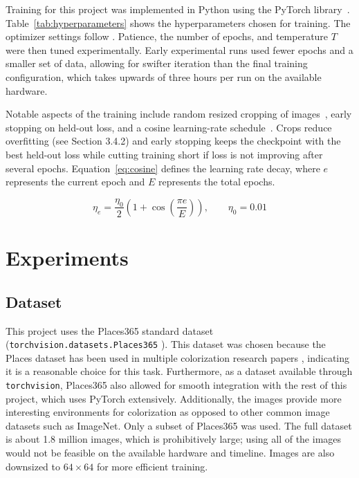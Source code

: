 \documentclass{article}
\begin{document}
Training for this project was implemented in Python using the PyTorch library~\citep{paszke2019pytorch}. Table~\ref{tab:hyperparameters} shows the hyperparameters chosen for training. The optimizer settings follow \citet{krizhevsky2012imagenet}. Patience, the number of epochs, and temperature $T$ were then tuned experimentally. Early experimental runs used fewer epochs and a smaller set of data, allowing for swifter iteration than the final training configuration, which takes upwards of three hours per run on the available hardware.

Notable aspects of the training include random resized cropping of images~\citep{szegedy2015going}, early stopping on held-out loss, and a cosine learning-rate schedule~\citep{loshchilov2017sgdr}. Crops reduce overfitting (see Section 3.4.2) and early stopping keeps the checkpoint with the best held-out loss while cutting training short if loss is not improving after several epochs. Equation~\ref{eq:cosine} defines the learning rate decay, where $e$ represents the current epoch and $E$ represents the total epochs.

\begin{equation}
\eta_e = \frac{\eta_0}{2}\left(1 + \cos\!\left(\frac{\pi e}{E}\right)\right),
\qquad \eta_0 = 0.01
\label{eq:cosine}
\end{equation}

\section{Experiments}

\subsection{Dataset}
This project uses the Places365 standard dataset (\texttt{torchvision.datasets.Places365} \citep{zhou2018places}). This dataset was chosen because the Places dataset has been used in multiple colorization research papers \citep[e.g.,][]{iizuka2016color}, indicating it is a reasonable choice for this task. Furthermore, as a dataset available through \texttt{torchvision}, Places365 also allowed for smooth integration with the rest of this project, which uses PyTorch extensively. Additionally, the images provide more interesting environments for colorization as opposed to other common image datasets such as ImageNet. Only a subset of Places365 was used. The full dataset is about 1.8 million images, which is prohibitively large; using all of the images would not be feasible on the available hardware and timeline. Images are also downsized to $64 \times 64$ for more efficient training.
\end{document}
